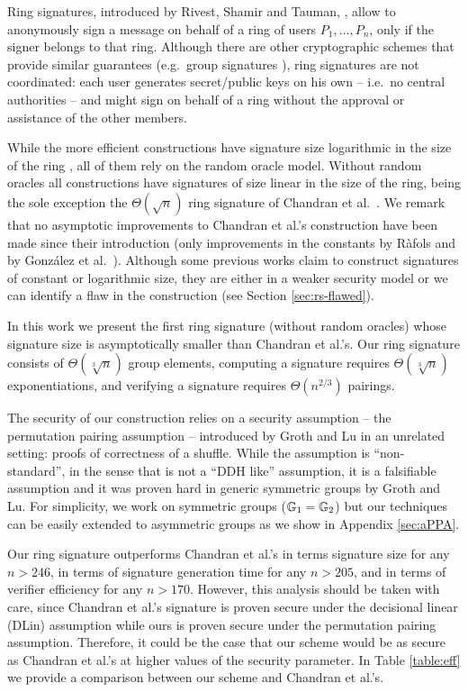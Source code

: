 Ring signatures, introduced by Rivest, Shamir and Tauman, \cite{AC:RivShaTau01}, allow to anonymously sign a message on behalf of a ring of users $P_1,\ldots,P_n$, only if the signer belongs to that ring. Although there are other cryptographic schemes that provide similar guarantees (e.g.~group signatures \cite{EC:ChaVan91}), ring signatures are not coordinated: each user generates secret/public keys on his own -- i.e.~no central authorities -- and might sign on behalf of a ring without the approval or assistance of the other members.

While the more efficient constructions have signature size logarithmic in the size of the ring \cite{EC:GroKoh15,EC:LLNW16}, all of them rely on the {random oracle model}.
Without random oracles all constructions have signatures of size linear in the size of the ring, being the sole exception the $\Theta(\sqrt{n})$ ring signature of Chandran et al.~\cite{ICALP:ChaGroSah07}. 
We remark that no asymptotic improvements to Chandran et al.'s construction have been made since their introduction (only improvements in the constants by R\`afols \cite{TCC:Rafols15} and by Gonz\'alez et al.~\cite{AC:GonHevRaf15}). Although some previous works claim to construct signatures of constant \cite{ACISP:BosDasRan15} or logarithmic \cite{IET:GriSusPla16} size, they are either in a weaker security model or we can identify a flaw in the construction (see Section \ref{sec:rs-flawed}). 

In this work we present the first ring signature (without random oracles) whose signature size is asymptotically smaller than Chandran et al.'s. Our ring signature consists of $\Theta(\sqrt[3]{n})$ group elements, computing a signature requires $\Theta(\sqrt[3]{n})$ exponentiations, and verifying a signature requires $\Theta(n^{2/3})$ pairings.

The security of our construction relies on a security assumption -- the {permutation pairing assumption} -- introduced by Groth and Lu \cite{AC:GroLu07} in an unrelated setting: proofs of correctness of a shuffle. While the assumption is ``non-standard'', in the sense that is not a ``DDH like'' assumption, it is a falsifiable assumption and it was proven hard in generic symmetric groups by Groth and Lu. For simplicity, we work on symmetric groups ($\mathbb{G}_1=\mathbb{G}_2$) but our techniques can be easily extended to asymmetric groups as we show in Appendix \ref{sec:aPPA}.

Our ring signature outperforms Chandran et al.'s in terms signature size for any $n > 246$, in terms of signature generation time for any $n>205$, and in terms of verifier efficiency for any $n>170$. However, this analysis should be taken with care, since Chandran et al.'s signature is proven secure under the decisional linear (DLin) assumption while ours is proven secure under the permutation pairing assumption. Therefore, it could be the case that our scheme would be as secure as Chandran et al.'s at higher values of the security parameter. In Table \ref{table:eff} we provide a comparison between our scheme and Chandran et al.'s.

